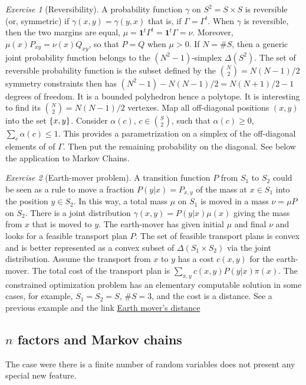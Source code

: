 \documentclass[12pt,a4paper]{amsart}
\newcommand{\one}{\bm 1}
\theoremstyle{plain}%
\theoremstyle{definition}
\theoremstyle{remark}
\newtheorem{exercise}{Exercise}
\begin{document}
\begin{exercise}[Reversibility]
  A probability function $\gamma$ on $S^2 = S \times S$ is reversible
  (or, symmetric) if $\gamma(x,y) = \gamma(y,x)$ that is, if
  $\Gamma = \Gamma^t$. When $\gamma$ is reversible, then the two
  margins are equal, $\mu = \one^t \Gamma^t = \one^t \Gamma =
  \nu$. Moreover, $\mu(x)P_{xy} = \nu(x) Q_{xy}$, so that $P=Q$ when
  $\mu > 0$. If $N = \# S$, then a generic joint probability function
  belongs to the $(N^2-1)$-simplex $\Delta(S^2)$. The set of
  reversible probability function is the subset defined by the
  $\binom N 2 = N(N-1)/2$ symmetry constraints then has
  $(N^2-1) - N(N-1)/2 = N(N+1)/2-1$ degrees of freedom. It is a
  bounded polyhedron hence a polytope. It is interesting to find its
  $\binom {N} 2 = N(N-1)/2$ vertexes. Map all off-diagonal positions
  $(x,y)$ into the set $\left\{x,y\right\}$. Consider $\alpha(c)$,
  $c \in \binom S 2$, such that $\alpha(c) \geq 0$,
  $\sum_c \alpha(c) \leq 1$. This provides a parametrization on a
  simplex of the off-diagonal elements of of $\Gamma$. Then put the
  remaining probability on the diagonal.  See below the application to
  Markov Chains.\end{exercise}

\begin{exercise}[Earth-mover problem]
  A transition function $P$ from $S_1$ to $S_2$ could be seen as a
  rule to move a fraction $P(y|x) = P_{x,y}$ of the mass at
  $x \in S_1$ into the position $y \in S_2$. In this way, a total mass
  $\mu$ on $S_1$ is moved in a mass $\nu = \mu P$ on $S_2$. There is a
  joint distribution $\gamma(x,y) = P(y|x)\mu(x)$ giving the mass from
  $x$ that is moved to $y$. The earth-mover has given initial $\mu$
  and final $\nu$ and looks for a feasible transport plan $P$. The set
  of feasible transport plans is convex and is better represented as a
  convex subset of $\Delta(S_1 \times S_2)$ via the joint
  distribution. Assume the transport from $x$ to $y$ has a cost
  $c(x,y)$ for the earth-mover. The total cost of the transport plan
  is $\sum_{x,y} c(x,y)P(y|x)\pi(x)$. The constrained optimization
  problem has an elementary computable solution in some cases, for
  example, $S_1=S_2=S$, $\#S = 3$, and the cost is a distance. See a
  previous example and the link
  \href{https://en.wikipedia.org/wiki/Earth_mover's_distance}{Earth
    mover's distance}
\end{exercise}
  
\subsection{$n$ factors and Markov chains}
\label{sec:n-factors}
The case were there is a finite number of random variables does not present any special new feature.
\end{document}
